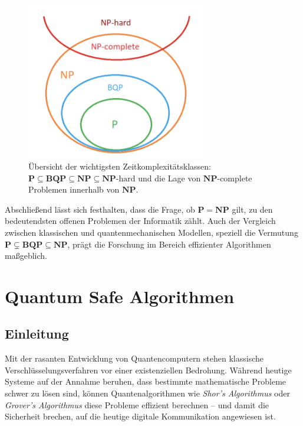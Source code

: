 \begin{figure}[h]
  \centering
  \includegraphics[width=0.7\textwidth]{images/basic-algorithms/problem-classes.png}
  \caption{Übersicht der wichtigsten Zeitkomplexitätsklassen: \(\mathbf{P}\subseteq \mathbf{BQP}\subseteq \mathbf{NP}\subseteq \mathbf{NP}\text{-hard}\) und die Lage von \(\mathbf{NP}\)-complete Problemen innerhalb von \(\mathbf{NP}\).}
  \label{fig:problem_classes}
\end{figure}

Abschließend lässt sich festhalten, dass die Frage, ob \(\mathbf{P}=\mathbf{NP}\) gilt, zu den bedeutendsten offenen Problemen der Informatik zählt. Auch der Vergleich zwischen klassischen und quantenmechanischen Modellen, speziell die Vermutung \(\mathbf{P}\subsetneq \mathbf{BQP}\subseteq \mathbf{NP}\), prägt die Forschung im Bereich effizienter Algorithmen maßgeblich.

\section{Quantum Safe Algorithmen}

\subsection*{Einleitung}

Mit der rasanten Entwicklung von Quantencomputern stehen klassische Verschlüsselungsverfahren vor einer existenziellen Bedrohung. Während heutige Systeme auf der Annahme beruhen, dass bestimmte mathematische Probleme schwer zu lösen sind, können Quantenalgorithmen wie \textit{Shor’s Algorithmus} oder \textit{Grover’s Algorithmus} diese Probleme effizient berechnen – und damit die Sicherheit brechen, auf die heutige digitale Kommunikation angewiesen ist.

